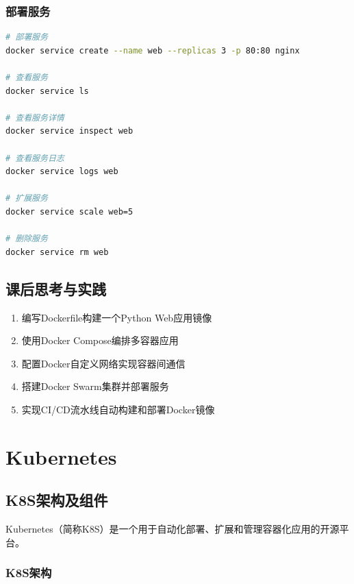 \documentclass[12pt,UTF8]{ctexbook}
\begin{document}
\subsection{部署服务}

\begin{lstlisting}[language=bash]
# 部署服务
docker service create --name web --replicas 3 -p 80:80 nginx

# 查看服务
docker service ls

# 查看服务详情
docker service inspect web

# 查看服务日志
docker service logs web

# 扩展服务
docker service scale web=5

# 删除服务
docker service rm web
\end{lstlisting}

\section{课后思考与实践}
\label{sec:docker-practice}
\begin{enumerate}
    \item 编写Dockerfile构建一个Python Web应用镜像
    \item 使用Docker Compose编排多容器应用
    \item 配置Docker自定义网络实现容器间通信
    \item 搭建Docker Swarm集群并部署服务
    \item 实现CI/CD流水线自动构建和部署Docker镜像
\end{enumerate}

\chapter{Kubernetes}
\label{chap:kubernetes}

\section{K8S架构及组件}
\label{sec:k8s-architecture}

Kubernetes（简称K8S）是一个用于自动化部署、扩展和管理容器化应用的开源平台。

\subsection{K8S架构}
\end{document}
